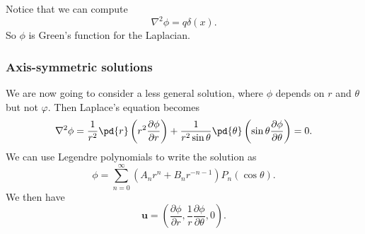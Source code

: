 \documentclass[a4paper]{article}
\begin{document}
Notice that we can compute
\[
  \nabla^2 \phi = q \delta(x).
\]
So $\phi$ is Green's function for the Laplacian.

\subsubsection{Axis-symmetric solutions}
We are now going to consider a less general solution, where $\phi$ depends on $r$ and $\theta$ but not $\varphi$. Then Laplace's equation becomes
\[
  \nabla^2 \phi = \frac{1}{r^2} \pd{r} \left(r^2 \frac{\partial \phi}{\partial r}\right) + \frac{1}{r^2 \sin \theta} \pd{\theta} \left(\sin \theta\frac{\partial \phi}{\partial \theta}\right) = 0.
\]
We can use Legendre polynomials to write the solution as
\[
  \phi = \sum_{n = 0}^\infty (A_n r^n + B_n r^{-n - 1})P_n(\cos \theta).
\]
We then have
\[
  \mathbf{u} =
  \left(\frac{\partial \phi}{\partial r}, \frac{1}{r}\frac{\partial \phi}{\partial \theta},0\right).
\]
\end{document}
